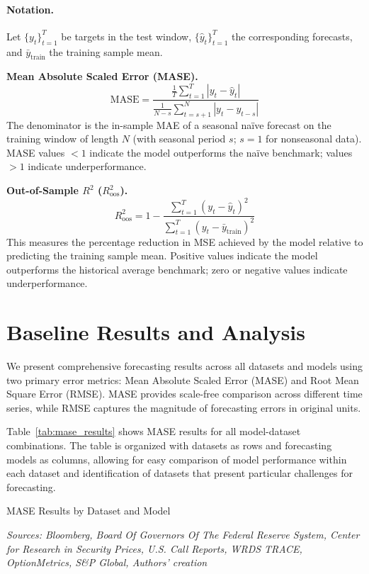 \documentclass{article}
\begin{document}
\paragraph{Notation.} Let $\{y_t\}_{t=1}^T$ be targets in the test window, $\{\hat y_t\}_{t=1}^T$ the corresponding forecasts, and $\bar{y}_{\text{train}}$ the training sample mean.

\medskip
\noindent\textbf{Mean Absolute Scaled Error (MASE).}
\[
\mathrm{MASE}=\frac{\frac{1}{T}\sum_{t=1}^T |y_t-\hat y_t|}
{\displaystyle \frac{1}{N-s}\sum_{t=s+1}^{N} |y_t - y_{t-s}|}
\]
The denominator is the in-sample MAE of a seasonal naïve forecast on the training window of length $N$ (with seasonal period $s$; $s{=}1$ for nonseasonal data). MASE values $<1$ indicate the model outperforms the naïve benchmark; values $>1$ indicate underperformance.

\medskip
\noindent\textbf{Out-of-Sample $R^2$ ($R^2_{\text{oos}}$).}
\[
R^2_{\text{oos}} = 1 - \frac{\sum_{t=1}^T (y_t-\hat y_t)^2}{\sum_{t=1}^T (y_t-\bar{y}_{\text{train}})^2}
\]
This measures the percentage reduction in MSE achieved by the model relative to predicting the training sample mean. Positive values indicate the model outperforms the historical average benchmark; zero or negative values indicate underperformance.


\section{Baseline Results and Analysis}
\label{sec:results}


We present comprehensive forecasting results across all datasets and models using two primary error metrics: Mean Absolute Scaled Error (MASE) and Root Mean Square Error (RMSE). MASE provides scale-free comparison across different time series, while RMSE captures the magnitude of forecasting errors in original units.

Table~\ref{tab:mase_results} shows MASE results for all model-dataset combinations. The table is organized with datasets as rows and forecasting models as columns, allowing for easy comparison of model performance within each dataset and identification of datasets that present particular challenges for forecasting.

\begin{table}[htbp]
\centering
\caption{MASE Results by Dataset and Model}
\label{tab:mase_results}

\caption*{
\scriptsize
\emph{Sources: Bloomberg, Board Of Governors Of The Federal Reserve System, Center for Research in Security Prices, U.S. Call Reports, WRDS TRACE, OptionMetrics, S\&P Global,  Authors' creation}}
\end{table}
\end{document}
